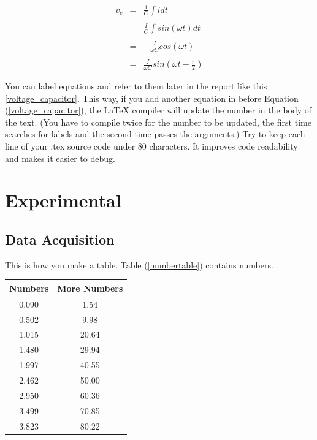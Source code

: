 \begin{eqnarray}
v_c &=& \frac{1}{C}\int{idt} \nonumber \\ \nonumber \\ %
&=& \frac{I}{C}\int{sin(\omega t)dt} \nonumber\\ \nonumber \\ %
&=& -\frac{I}{\omega C}cos(\omega t) \nonumber \\ \nonumber \\
&=& \frac{I}{\omega C}sin(\omega t - \frac{\pi}{2})	
\label{voltage_capacitor} %
\end{eqnarray} 

You can label equations and refer to them later in the report like this 
\ref{voltage_capacitor}. This way, if you add another equation in before 
Equation (\ref{voltage_capacitor}), the \LaTeX \; compiler will update the 
number in the body of the text. (You have to compile twice for the number to be 
updated, the first time searches for labels and the second time passes the arguments.) 
Try to keep each line of your .tex source code under 80 characters. 
It improves code readability and makes it easier to debug.

\pagebreak
\section{Experimental}

\subsection{Data Acquisition}
\par This is how you make a table. Table (\ref{numbertable}) contains numbers.

\begin{center}  
\vspace{.3cm} %
\small{
\begin{tabular}{||c|c||} %
\hline
\hline
Numbers & More Numbers \\
\hline
\hline
0.090 &	1.54 \\ \hline %
0.502 &	9.98 \\ 
1.015 &	20.64 \\ \hline \hline
1.480 &	29.94 \\
1.997 &	40.55 \\ \hline \hline \hline
2.462 &	50.00 \\
2.950 &	60.36 \\
3.499 &	70.85 \\
3.823 &	80.22 \\
\hline
\end{tabular}}\\
\label{numbertable} 
\vspace{.4 cm}
\end{center}

